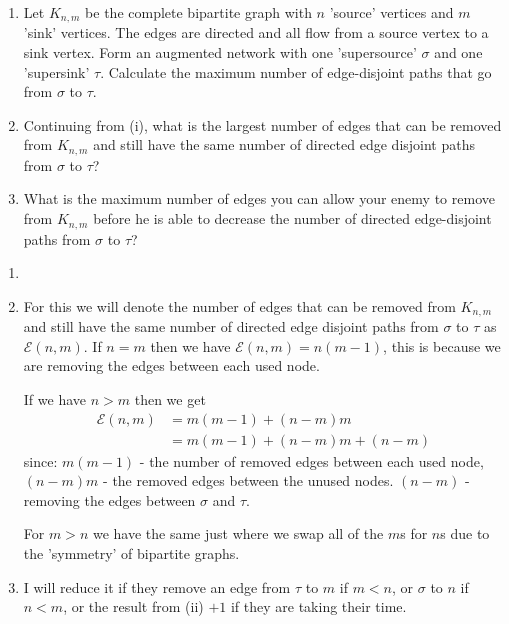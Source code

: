 \documentclass[10pt, a4paper]{article}
\begin{document}
\begin{example}
    \begin{enumerate}[label = (\roman*)]
        \item Let $K_{n, m}$ be the complete bipartite graph with $n$ 'source' vertices and $m$ 'sink' vertices.
        The edges are directed and all flow from a source vertex to a sink vertex.
        Form an augmented network with one 'supersource' $\sigma$ and one 'supersink' $\tau$.
        Calculate the maximum number of edge-disjoint paths that go from $\sigma$ to $\tau$.

        \item Continuing from (i),
        what is the largest number of edges that can be removed from $K_{n, m}$ and still have the same number of directed edge disjoint paths from $\sigma$ to $\tau$?

        \item What is the maximum number of edges you can allow your enemy to remove from $K_{n, m}$ before he is able to decrease the number of directed edge-disjoint paths from $\sigma$ to $\tau$?
    \end{enumerate}

    \begin{solution}
        \begin{enumerate}[label = (\roman*)]
            \item \phantom{}

            \item
            For this we will denote the number of edges that can be removed from $K_{n, m}$ and still have the same number of directed edge disjoint paths from $\sigma$ to $\tau$ as $\mathcal{E}(n, m)$.
            If $n = m$ then we have $\mathcal{E}(n, m) = n(m - 1)$,
            this is because we are removing the edges between each used node.

            If we have $n > m$ then we get
            \begin{align*}
                \mathcal{E}(n, m) &= m(m - 1) + (n - m)m \\
                &= m(m - 1) + (n - m)m + (n - m)
            \end{align*}
            since:
            $m(m - 1)$ - the number of removed edges between each used node,
            $(n - m)m$ - the removed edges between the unused nodes.
            $(n - m)$ - removing the edges between $\sigma$ and $\tau$.

            For $m > n$ we have the same just where we swap all of the $m$s for $n$s due to the 'symmetry' of bipartite graphs.

            \item I will reduce it if they remove an edge from $\tau$ to $m$ if $m < n$,
            or $\sigma$ to $n$ if $n < m$,
            or the result from (ii) $+1$ if they are taking their time.
        \end{enumerate}
    \end{solution}
\end{example}
\end{document}
